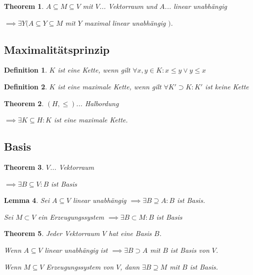 \documentclass[twocolumn]{article}
\newtheorem{theorem}{Theorem}[section]
\newtheorem{lemma}[theorem]{Lemma}
\newtheorem{definition}{Definition}[section]
\begin{document}
\begin{theorem}
	$A \subseteq M \subseteq V$ mit $V$... Vektorraum und $A$... linear unabhängig
	
	$\implies \exists Y (A \subseteq Y \subseteq M$ mit $Y$ maximal linear unabhängig $)$.
\end{theorem}

\subsection{Maximalitätsprinzip}

\begin{definition}
	$K$ ist eine Kette, wenn gilt $\forall x,y \in K : x \leq y \lor y \leq x$
\end{definition}

\begin{definition}
	$K$ ist eine maximale Kette, wenn gilt $\forall K' \supset K : K'$ ist keine Kette
\end{definition}

\begin{theorem}
	$(H,\leq)$... Halbordung
	
	$\implies \exists K \subseteq H : K$ ist eine maximale Kette.
\end{theorem}

\subsection{Basis}

\begin{theorem}
	$V$... Vektorraum
	
	$\implies \exists B \subseteq V : B$ ist Basis
\end{theorem}

\begin{lemma}
	Sei $A \subseteq V$ linear unabhängig $\implies \exists B \supseteq A : B$ ist Basis.
	
	Sei $M \subset V$ ein Erzeugungssystem $\implies \exists B \subset M : B$ ist Basis
\end{lemma}

\begin{theorem}
	Jeder Vektorraum $V$ hat eine Basis $B$.
	
	Wenn $A \subseteq V$ linear unabhängig ist $\implies \exists B \supset A$ mit $B$ ist Basis von $V$.
	
	Wenn $M \subseteq V$ Erzeugungssystem von $V$, dann $\exists B \supseteq M$ mit $B$ ist Basis.
\end{theorem}
\end{document}
